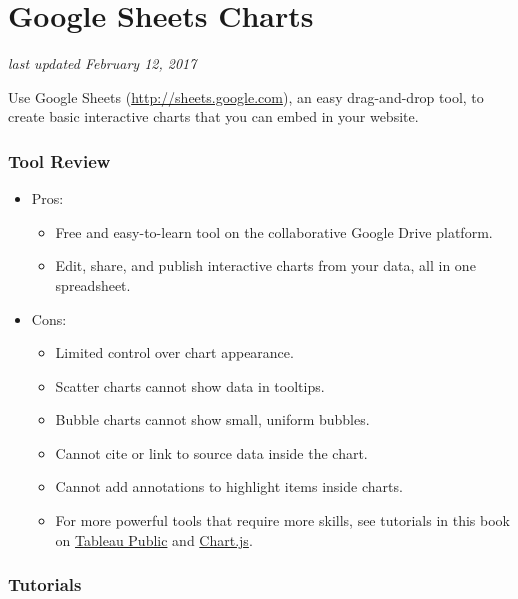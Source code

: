 \documentclass[
  english,
]{book}
\providecommand{\tightlist}{%
  \setlength{\itemsep}{0pt}\setlength{\parskip}{0pt}}
\begin{document}
\hypertarget{chart-google-sheets}{%
\section{Google Sheets Charts}\label{chart-google-sheets}}

\emph{last updated February 12, 2017}

Use Google Sheets (\url{http://sheets.google.com}), an easy drag-and-drop tool, to create basic interactive charts that you can embed in your website.

\hypertarget{tool-review}{%
\subsubsection*{Tool Review}\label{tool-review}}

\begin{itemize}
\tightlist
\item
  Pros:

  \begin{itemize}
  \tightlist
  \item
    Free and easy-to-learn tool on the collaborative Google Drive platform.
  \item
    Edit, share, and publish interactive charts from your data, all in one spreadsheet.
  \end{itemize}
\item
  Cons:

  \begin{itemize}
  \tightlist
  \item
    Limited control over chart appearance.
  \item
    Scatter charts cannot show data in tooltips.
  \item
    Bubble charts cannot show small, uniform bubbles.
  \item
    Cannot cite or link to source data inside the chart.
  \item
    Cannot add annotations to highlight items inside charts.
  \item
    For more powerful tools that require more skills, see tutorials in this book on \href{scatter-chart-tableau/}{Tableau Public} and \href{chartjs}{Chart.js}.
  \end{itemize}
\end{itemize}

\hypertarget{tutorials}{%
\subsubsection*{Tutorials}\label{tutorials}}
\end{document}
